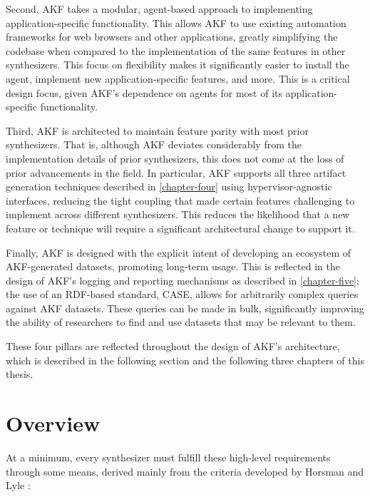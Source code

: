 \documentclass[letterpaper,12pt]{report}
\begin{document}
Second, AKF takes a modular, agent-based approach to implementing
application-specific functionality. This allows AKF to use existing
automation frameworks for web browsers and other applications, greatly
simplifying the codebase when compared to the implementation of the same
features in other synthesizers. This focus on flexibility makes it
significantly easier to install the agent, implement new
application-specific features, and more. This is a critical design
focus, given AKF's dependence on agents for most of its
application-specific functionality.

Third, AKF is architected to maintain feature parity with most prior
synthesizers. That is, although AKF deviates considerably from the
implementation details of prior synthesizers, this does not come at the
loss of prior advancements in the field. In particular, AKF supports all
three artifact generation techniques described in \autoref{chapter-four} using hypervisor-agnostic interfaces, reducing the tight
coupling that made certain features challenging to implement across
different synthesizers. This reduces the likelihood that a new feature
or technique will require a significant architectural change to support
it.

Finally, AKF is designed with the explicit intent of developing an
ecosystem of AKF-generated datasets, promoting long-term usage. This is
reflected in the design of AKF's logging and reporting mechanisms as
described in \autoref{chapter-five}; the use of an
RDF-based standard, CASE, allows for arbitrarily complex queries against
AKF datasets. These queries can be made in bulk, significantly improving
the ability of researchers to find and use datasets that may be relevant
to them.

These four pillars are reflected throughout the design of AKF's
architecture, which is described in the following section and the
following three chapters of this thesis.

\section{Overview}\label{overview}

At a minimum, every synthesizer must fulfill these high-level
requirements through some means, derived mainly from the criteria
developed by Horsman and Lyle
\cite{horsmanDatasetConstructionChallenges2021}:
\end{document}
